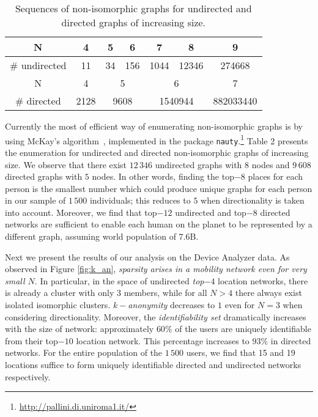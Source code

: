 \begin{table}[!]
	\begin{center}
	\resizebox{0.7\textwidth}{!}
	{
	\label{sequences_of_nonisomorphic}
	\begin{tabular}{|c|c|c|c|c|c|c|}
		\hline
		N             & 4    & 5           & 6           & 7            & 8             & 9         \\ \hline
		\# undirected & 11   & 34          & 156         & 1044         & 12346         & 274668    \\ \hline
		N             & 4    & \multicolumn{2}{c|}{5}    & \multicolumn{2}{c|}{6}       & 7         \\ \hline
		\# directed   & 2128 & \multicolumn{2}{c|}{9608} & \multicolumn{2}{c|}{1540944} & 882033440 \\ \hline
	\end{tabular}
}
	\caption{{Sequences of non-isomorphic graphs for undirected and directed graphs of increasing size.}}
		\end{center}
\end{table}


Currently the most of efficient way of enumerating  non-isomorphic graphs is by using McKay's algorithm~\cite{McKay}, implemented in the package \texttt{nauty}.\footnote{\url{http://pallini.di.uniroma1.it/}}
Table 2 presents the enumeration for undirected and directed non-isomorphic graphs of increasing size.
We observe that there exist $12\,346$ undirected graphs with $8$ nodes and $9\,608$ directed graphs with $5$ nodes.
In other words, finding the top$-8$ places for each person is the smallest number which could produce unique graphs for each person in our sample of $1\,500$ individuals; this reduces to $5$ when directionality is taken into account.
Moreover, we find that top$-12$ undirected and top$-8$ directed networks are sufficient to enable each human on the planet to be represented by a different graph, assuming world population of $7.6$B.



Next we present the results of our analysis on the Device Analyzer data.
As observed in Figure \ref{fig:k_an}, \emph{sparsity arises in a mobility network even for very small $ N $}.
In particular, in the space of undirected \emph{top$-4$} location networks, there is already a cluster with only $ 3 $ members, while for all $ N > 4 $ there always exist isolated isomorphic clusters.
\emph{$ k-$anonymity} decreases to $ 1 $ even for $ N=3 $ when considering directionality.
Moreover, the \emph{identifiability set} dramatically increases with the size of network: approximately $ 60\% $ of the users are uniquely identifiable from their top$-10$ location network.
This percentage increases to $93\%$ in directed networks.
For the entire population of the $ 1\,500 $ users, we find that 15 and 19 locations suffice to form uniquely identifiable directed and undirected networks respectively.


